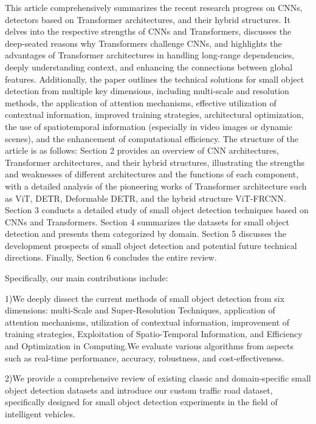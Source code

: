 \documentclass[journal]{IEEEtran}
\begin{document}
This article comprehensively summarizes the recent research progress on CNNs, detectors based on Transformer architectures, and their hybrid structures. It delves into the respective strengths of CNNs and Transformers, discusses the deep-seated reasons why Transformers challenge CNNs, and highlights the advantages of Transformer architectures in handling long-range dependencies, deeply understanding context, and enhancing the connections between global features. Additionally, the paper outlines the technical solutions for small object detection from multiple key dimensions, including multi-scale and resolution methods, the application of attention mechanisms, effective utilization of contextual information, improved training strategies, architectural optimization, the use of spatiotemporal information (especially in video images or dynamic scenes), and the enhancement of computational efficiency. The structure of the article is as follows: Section 2 provides an overview of CNN architectures, Transformer architectures, and their hybrid structures, illustrating the strengths and weaknesses of different architectures and the functions of each component, with a detailed analysis of the pioneering works of Transformer architecture such as ViT\cite{dosovitskiy2020image}, DETR\cite{carion2020end}, Deformable DETR\cite{zhu2020deformable}, and the hybrid structure ViT-FRCNN\cite{beal2020toward}. Section 3 conducts a detailed study of small object detection techniques based on CNNs and Transformers. Section 4 summarizes the datasets for small object detection and presents them categorized by domain. Section 5 discusses the development prospects of small object detection and potential future technical directions. Finally, Section 6 concludes the entire review.

Specifically, our main contributions include:

  1)We deeply dissect the current methods of small object detection from six dimensions: multi-Scale and Super-Resolution Techniques, application of attention mechanisms, utilization of contextual information, improvement of training strategies, Exploitation of Spatio-Temporal Information, and Efficiency and Optimization in Computing.We evaluate various algorithms from aspects such as real-time performance, accuracy, robustness, and cost-effectiveness.

  2)We provide a comprehensive review of existing classic and domain-specific small object detection datasets and introduce our custom traffic road dataset, specifically designed for small object detection experiments in the field of intelligent vehicles.
\end{document}

